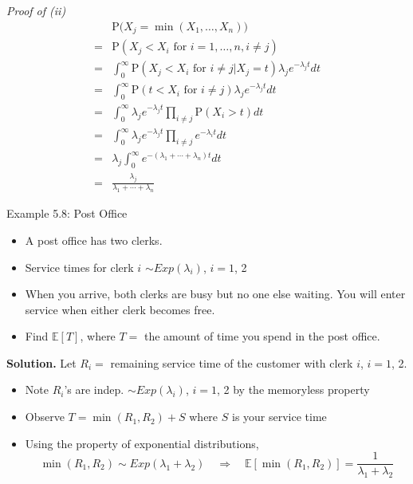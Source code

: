 \documentclass[letterpaper,handout, mathserif]{beamer}
\def\p{\mathrm P}
\def\E{\mathbb E}
\begin{document}
\begin{frame}
{\em Proof of (ii)}
\begin{align*}
&\p\big(X_{j}=\min(X_1,\ldots,X_n)\big)\\
={}&\p(X_j < X_i\mbox{ for }i =1,\ldots,n, i\neq j)\\
={}&\int^{\infty}_0 \p(X_j < X_i\mbox{ for }i \neq j|X_j = t)\lambda_j e^{-\lambda_j t}dt\\
={}&\int^{\infty}_0 \p(t < X_i\mbox{ for }i \neq j)\lambda_j e^{-\lambda_j t}dt\\
={}&\int^{\infty}_0\lambda_j e^{-\lambda_j t} \prod_{i\neq j} \p(X_i > t)dt\\
={}&\int^{\infty}_0 \lambda_j e^{-\lambda_j t}\prod_{i\neq j} e^{-\lambda_i t}dt\\
={}& \lambda_j\int^{\infty}_0 e^{-(\lambda_1+\cdots+\lambda_n)t}dt\\
={}& \frac{\lambda_j}{\lambda_1+\cdots+\lambda_n}
\end{align*}
\end{frame}
\begin{frame}{Example 5.8: Post Office}
\begin{itemize}
\item A post office has two clerks.
\item Service times for clerk $i$ $\sim Exp(\lambda_i)$, $i = 1$, 2
\item When you arrive, both clerks are busy but no one else waiting. You will enter service
when either clerk becomes free.
\item Find $\E[T]$, where $T=$ the amount of time you spend in the post office.
\end{itemize}
{\bf Solution.}
Let $R_i=$ remaining service time of the customer with clerk $i$, $i = 1$, 2.
\begin{itemize}
\item Note $R_i$'s are indep. $\sim Exp(\lambda_i)$, $i = 1$, 2 by the memoryless property
\item Observe $T = \min(R_1, R_2) + S$ where $S$ is your service time
\item Using the property of exponential distributions,
$$
\min(R_1, R_2)\sim Exp(\lambda_1+\lambda_2)\quad\Rightarrow\quad \E[\min(R_1, R_2)]=\frac{1}{\lambda_1+\lambda_2}
$$
\end{itemize}
\end{frame}
\end{document}
